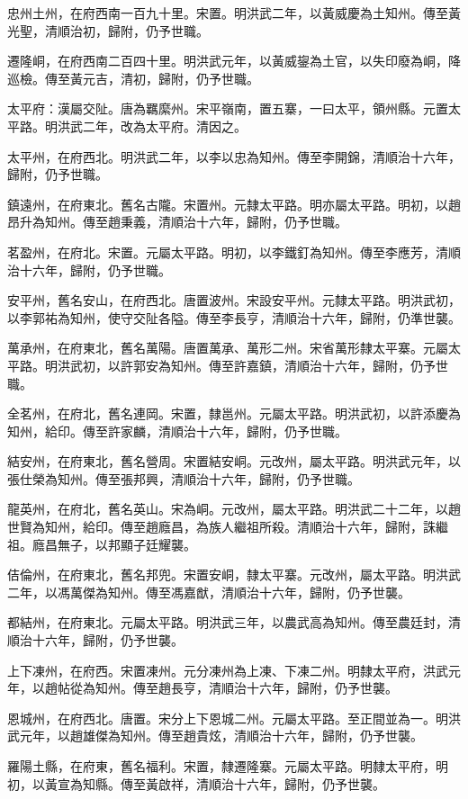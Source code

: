 \begin{pinyinscope}
忠州土州，在府西南一百九十里。宋置。明洪武二年，以黃威慶為土知州。傳至黃光聖，清順治初，歸附，仍予世職。

遷隆峒，在府西南二百四十里。明洪武元年，以黃威鋆為土官，以失印廢為峒，降巡檢。傳至黃元吉，清初，歸附，仍予世職。

太平府：漢屬交阯。唐為羈縻州。宋平嶺南，置五寨，一曰太平，領州縣。元置太平路。明洪武二年，改為太平府。清因之。

太平州，在府西北。明洪武二年，以李以忠為知州。傳至李開錦，清順治十六年，歸附，仍予世職。

鎮遠州，在府東北。舊名古隴。宋置州。元隸太平路。明亦屬太平路。明初，以趙昂升為知州。傳至趙秉義，清順治十六年，歸附，仍予世職。

茗盈州，在府北。宋置。元屬太平路。明初，以李鐵釘為知州。傳至李應芳，清順治十六年，歸附，仍予世職。

安平州，舊名安山，在府西北。唐置波州。宋設安平州。元隸太平路。明洪武初，以李郭祐為知州，使守交阯各隘。傳至李長亨，清順治十六年，歸附，仍準世襲。

萬承州，在府東北，舊名萬陽。唐置萬承、萬形二州。宋省萬形隸太平寨。元屬太平路。明洪武初，以許郭安為知州。傳至許嘉鎮，清順治十六年，歸附，仍予世職。

全茗州，在府北，舊名連岡。宋置，隸邕州。元屬太平路。明洪武初，以許添慶為知州，給印。傳至許家麟，清順治十六年，歸附，仍予世職。

結安州，在府東北，舊名營周。宋置結安峒。元改州，屬太平路。明洪武元年，以張仕榮為知州。傳至張邦興，清順治十六年，歸附，仍予世職。

龍英州，在府北，舊名英山。宋為峒。元改州，屬太平路。明洪武二十二年，以趙世賢為知州，給印。傳至趙廕昌，為族人繼祖所殺。清順治十六年，歸附，誅繼祖。廕昌無子，以邦顯子廷耀襲。

佶倫州，在府東北，舊名邦兜。宋置安峒，隸太平寨。元改州，屬太平路。明洪武二年，以馮萬傑為知州。傳至馮嘉猷，清順治十六年，歸附，仍予世襲。

都結州，在府東北。元屬太平路。明洪武三年，以農武高為知州。傳至農廷封，清順治十六年，歸附，仍予世襲。

上下凍州，在府西。宋置凍州。元分凍州為上凍、下凍二州。明隸太平府，洪武元年，以趙帖從為知州。傳至趙長亨，清順治十六年，歸附，仍予世襲。

恩城州，在府西北。唐置。宋分上下恩城二州。元屬太平路。至正間並為一。明洪武元年，以趙雄傑為知州。傳至趙貴炫，清順治十六年，歸附，仍予世襲。

羅陽土縣，在府東，舊名福利。宋置，隸遷隆寨。元屬太平路。明隸太平府，明初，以黃宣為知縣。傳至黃啟祥，清順治十六年，歸附，仍予世襲。


\end{pinyinscope}
